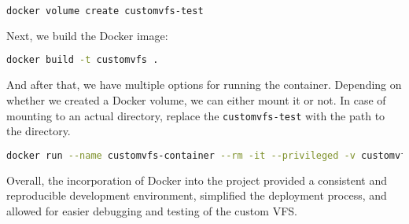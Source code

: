 \begin{lstlisting}[language=bash, basicstyle=\ttfamily\small]
docker volume create customvfs-test
\end{lstlisting}

Next, we build the Docker image:

\begin{lstlisting}[language=bash, basicstyle=\ttfamily\small]
docker build -t customvfs .
\end{lstlisting}

And after that, we have multiple options for running the container.
Depending on whether we created a Docker volume, we can either mount it or not.
In case of mounting to an actual directory, replace the \texttt{customvfs-test} with the path to the directory.


\begin{lstlisting}[language=bash, basicstyle=\ttfamily\small]
docker run --name customvfs-container --rm -it --privileged -v customvfs-test:/mnt/fs customvfs
\end{lstlisting}


Overall, the incorporation of Docker into the project provided a consistent and reproducible development environment, simplified the deployment process, and allowed for easier debugging and testing of the custom VFS.